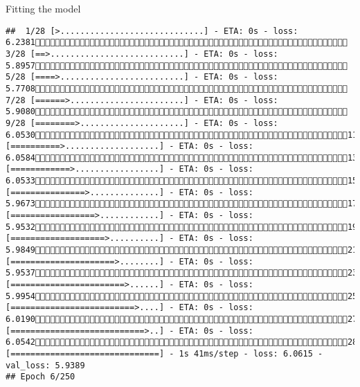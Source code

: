 \documentclass[
  ignorenonframetext,
]{beamer}
\begin{document}
\begin{frame}[fragile]{Fitting the model}
\begin{verbatim}
##  1/28 [>.............................] - ETA: 0s - loss: 6.2381 3/28 [==>...........................] - ETA: 0s - loss: 5.8957 5/28 [====>.........................] - ETA: 0s - loss: 5.7708 7/28 [======>.......................] - ETA: 0s - loss: 5.9080 9/28 [========>.....................] - ETA: 0s - loss: 6.053011/28 [==========>...................] - ETA: 0s - loss: 6.058413/28 [============>.................] - ETA: 0s - loss: 6.053315/28 [===============>..............] - ETA: 0s - loss: 5.967317/28 [=================>............] - ETA: 0s - loss: 5.953219/28 [===================>..........] - ETA: 0s - loss: 5.984921/28 [=====================>........] - ETA: 0s - loss: 5.953723/28 [=======================>......] - ETA: 0s - loss: 5.995425/28 [=========================>....] - ETA: 0s - loss: 6.019027/28 [===========================>..] - ETA: 0s - loss: 6.054228/28 [==============================] - 1s 41ms/step - loss: 6.0615 - val_loss: 5.9389
## Epoch 6/250

\end{verbatim}
\end{frame}
\end{document}
